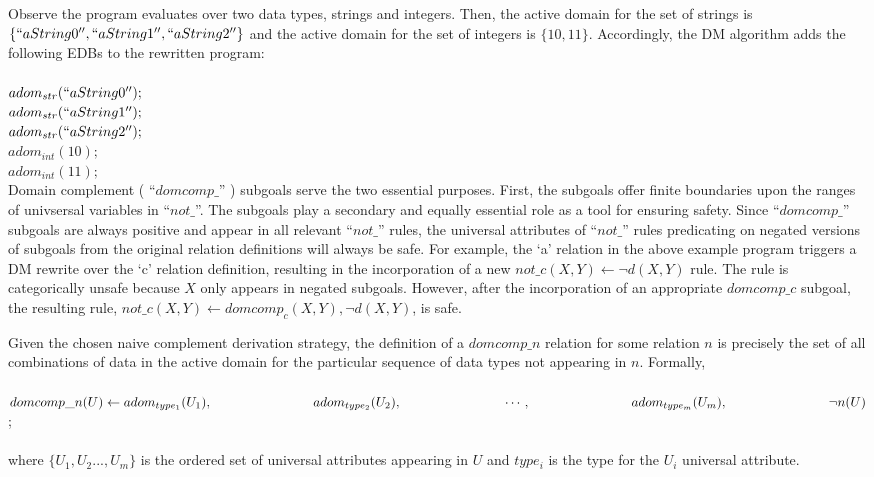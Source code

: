 Observe the program evaluates over two data types, strings and integers. Then, the active domain for the set of strings is $\{ ``aString0'', ``aString1'', ``aString2'' \}$ and the active domain for the set of integers is $\{ 10, 11 \}$. Accordingly, the DM algorithm adds the following EDBs to the rewritten program:
\\ \\
$adom_{str}( ``aString0'' ) ; $\\
$adom_{str}( ``aString1'' ) ; $\\
$adom_{str}( ``aString2'' ) ; $\\
$adom_{int}( 10 ) ; $\\
$adom_{int}( 11 ) ; $
\\

Domain complement ( ``$domcomp\_$'' ) subgoals serve the two essential purposes. First, the subgoals offer finite boundaries upon the ranges of univsersal variables in ``$not\_$''. The subgoals play a secondary and equally essential role as a tool for ensuring safety. Since ``$domcomp\_$'' subgoals are always positive and appear in all relevant ``$not\_$'' rules, the universal attributes of ``$not\_$'' rules predicating on negated versions of subgoals from the original relation definitions will always be safe. For example, the `a' relation in the above example program triggers a DM rewrite over the `c' relation definition, resulting in the incorporation of a new $not\_c(X,Y) \leftarrow \neg d(X,Y)$ rule. The rule is categorically unsafe because $X$ only appears in negated subgoals. However, after the incorporation of an appropriate $domcomp\_c$ subgoal, the resulting rule, $not\_c(X,Y) \leftarrow domcomp_c(X,Y), \neg d(X,Y)$, is safe.

Given the chosen naive complement derivation strategy, the definition of a $domcomp\_n$ relation for some relation $n$ is precisely the set of all combinations of data in the active domain for the particular sequence of data types not appearing in $n$. Formally, 
\\ \\
$domcomp\_n(U) \leftarrow adom_{type_1}(U_1), \\
\-\hspace{2.7cm} adom_{type_2}(U_2), \\
\-\hspace{2.7cm} \cdots, \\
\-\hspace{2.7cm} adom_{type_m}(U_m), \\
\-\hspace{2.7cm} \neg n( U )$ ;
\\ \\
where $\{ U_1, U_2 ..., U_m \}$ is the ordered set of universal attributes appearing in $U$ and $type_i$ is the type for the $U_i$ universal attribute.

